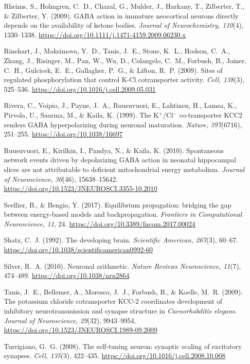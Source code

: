 \documentclass[11pt,a4paper]{article}
\newenvironment{apabib}{\raggedright\begin{list}{}{%
  \setlength{\leftmargin}{1.6em}\setlength{\itemindent}{-1.6em}%
  \setlength{\itemsep}{3pt}\setlength{\parsep}{0pt}\setlength{\topsep}{4pt}}}%
  {\end{list}}
\begin{document}
\begin{apabib}
\item Rheims, S., Holmgren, C.~D., Chazal, G., Mulder, J., Harkany, T., Zilberter, T., \& Zilberter, Y. (2009). GABA action in immature neocortical neurons directly depends on the availability of ketone bodies. \emph{Journal of Neurochemistry, 110}(4), 1330--1338. \url{https://doi.org/10.1111/j.1471-4159.2009.06230.x}
\item Rinehart, J., Maksimova, Y.~D., Tanis, J.~E., Stone, K.~L., Hodson, C.~A., Zhang, J., Risinger, M., Pan, W., Wu, D., Colangelo, C.~M., Forbush, B., Joiner, C.~H., Gulcicek, E.~E., Gallagher, P.~G., \& Lifton, R.~P. (2009). Sites of regulated phosphorylation that control K-Cl cotransporter activity. \emph{Cell, 138}(3), 525--536. \url{https://doi.org/10.1016/j.cell.2009.05.031}
\item Rivera, C., Voipio, J., Payne, J.~A., Ruusuvuori, E., Lahtinen, H., Lamsa, K., Pirvola, U., Saarma, M., \& Kaila, K. (1999). The K$^{+}$/Cl$^{-}$ co-transporter KCC2 renders GABA hyperpolarizing during neuronal maturation. \emph{Nature, 397}(6716), 251--255. \url{https://doi.org/10.1038/16697}
\item Ruusuvuori, E., Kirilkin, I., Pandya, N., \& Kaila, K. (2010). Spontaneous network events driven by depolarizing GABA action in neonatal hippocampal slices are not attributable to deficient mitochondrial energy metabolism. \emph{Journal of Neuroscience, 30}(46), 15638--15642. \url{https://doi.org/10.1523/JNEUROSCI.3355-10.2010}
\item Scellier, B., \& Bengio, Y. (2017). Equilibrium propagation: bridging the gap between energy-based models and backpropagation. \emph{Frontiers in Computational Neuroscience, 11}, 24. \url{https://doi.org/10.3389/fncom.2017.00024}
\item Shatz, C.~J. (1992). The developing brain. \emph{Scientific American, 267}(3), 60--67. \url{https://doi.org/10.1038/scientificamerican0992-60}
\item Silver, R.~A. (2010). Neuronal arithmetic. \emph{Nature Reviews Neuroscience, 11}(7), 474--489. \url{https://doi.org/10.1038/nrn2864}
\item Tanis, J.~E., Bellemer, A., Moresco, J.~J., Forbush, B., \& Koelle, M.~R. (2009). The potassium chloride cotransporter KCC-2 coordinates development of inhibitory neurotransmission and synapse structure in \emph{Caenorhabditis elegans}. \emph{Journal of Neuroscience, 29}(32), 9943--9954. \url{https://doi.org/10.1523/JNEUROSCI.1989-09.2009}
\item Turrigiano, G.~G. (2008). The self-tuning neuron: synaptic scaling of excitatory synapses. \emph{Cell, 135}(3), 422--435. \url{https://doi.org/10.1016/j.cell.2008.10.008}

\end{apabib}
\end{document}

